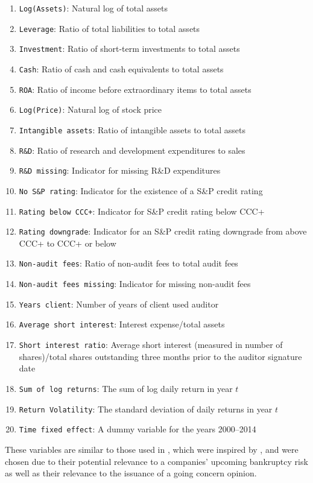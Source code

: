 \documentclass[aoas,preprint, 11pt, dvipsnames, table, x11name]{imsart}
\theoremstyle{remark}
\begin{document}
	\small 
	\begin{enumerate}\label{covariates}
		\itemsep0em 
		\item {\tt Log(Assets)}: Natural log of total assets
		\item {\tt Leverage}: Ratio of total liabilities to total assets
		\item {\tt Investment}: Ratio of short-term investments to total assets
		\item {\tt Cash}: Ratio of cash and cash equivalents to total assets
		\item {\tt ROA}: Ratio of income before extraordinary items to total assets
		\item {\tt Log(Price)}:  Natural log of stock price
		\item {\tt Intangible assets}: Ratio of intangible assets to total assets
		\item {\tt R\&D}: Ratio of research and development expenditures to sales
		\item {\tt R\&D missing}: Indicator for missing R\&D expenditures
		\item {\tt No S\&P rating}: Indicator for the existence of a S\&P credit rating
		\item {\tt Rating below CCC+}: Indicator for S\&P credit rating below CCC+
		\item {\tt Rating downgrade}: Indicator for an S\&P credit rating downgrade from above CCC+ to CCC+ or below
		\item {\tt Non-audit fees}: Ratio of non-audit fees to total audit fees
		\item {\tt  Non-audit fees missing}: Indicator for missing non-audit fees
		\item {\tt Years client}: Number of years of client used auditor
		\item {\tt Average short interest}: Interest expense/total assets
		\item {\tt Short interest ratio}: Average short interest (measured in number of shares)/total shares outstanding three months prior to the auditor signature date
		\item {\tt Sum of log returns}: The sum of log daily return in year $t$
		\item {\tt Return Volatility}: The standard deviation of daily returns in year $t$
		\item {\tt Time fixed effect}: A dummy variable for the years 2000--2014
	\end{enumerate}
	\normalsize
	These variables are similar to those used in \cite{paper}, which were inspired by \cite{defond-2002}, and were chosen due to their potential relevance to a companies' upcoming bankruptcy risk as well as their relevance to the issuance of a going concern opinion. 
	\color{black}
\end{document}
